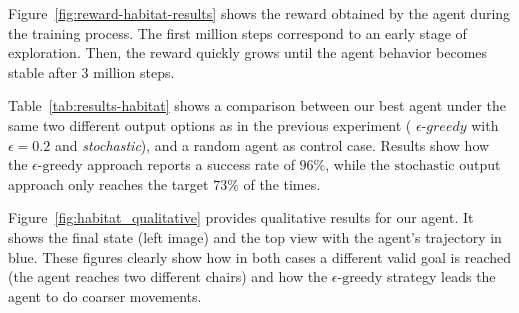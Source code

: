 Figure~\ref{fig:reward-habitat-results} shows the reward obtained by the agent during the training process.
The first million steps correspond to an early stage of exploration.
Then, the reward quickly grows until the agent behavior becomes stable after 3 million steps.

Table~\ref{tab:results-habitat} shows a comparison between our best agent under the same two different output options as in the previous experiment ( $\epsilon\text{-}greedy$ with $\epsilon=0.2$ and \textit{stochastic}), and a random agent as control case.
Results show how the $\epsilon\text{-greedy}$ approach reports a success rate of $96\%$, while the $\text{stochastic}$ output approach only reaches the target $73\%$ of the times.

Figure~\ref{fig:habitat_qualitative} provides qualitative results for our agent.
It shows the final state (left image) and the top view with the agent's trajectory in blue.
These figures clearly show how in both cases a different valid goal is reached (the agent reaches two different chairs) and how the $\epsilon\text{-greedy}$ strategy leads the agent to do coarser movements.

\begin{table}
    \caption{\textbf{Best agent performance on 100 test episodes in Habitat.} The $\epsilon\text{-greedy}$ output mode reports the best results.}
    \label{tab:results-habitat}
\end{table}

